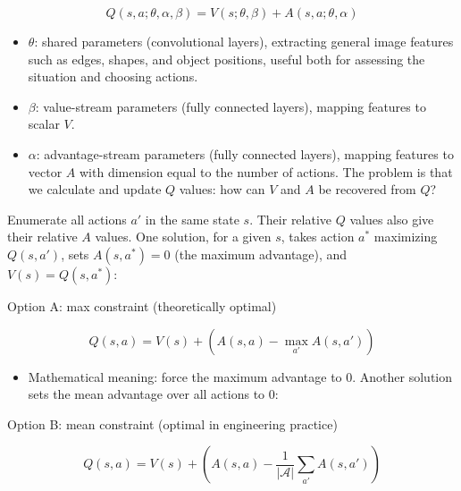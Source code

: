 \[
Q(s,a;\theta,\alpha,\beta)=V(s;\theta,\beta)+A(s,a;\theta,\alpha)
\]

\begin{itemize}
\tightlist
\item
  \(\theta\): shared parameters (convolutional layers), extracting general image features such as edges, shapes, and object positions, useful both for assessing the situation and choosing actions.
\item
  \(\beta\): value-stream parameters (fully connected layers), mapping features to scalar \(V\).
\item
  \(\alpha\): advantage-stream parameters (fully connected layers), mapping features to vector \(A\) with dimension equal to the number of actions.
  The problem is that we calculate and update \(Q\) values: how can \(V\) and \(A\) be recovered from \(Q\)?
\end{itemize}

Enumerate all actions \(a'\) in the same state \(s\). Their relative \(Q\) values also give their relative \(A\) values. One solution, for a given \(s\), takes action \(a^*\) maximizing \(Q(s,a')\), sets \(A(s,a^*)=0\) (the maximum advantage), and \(V(s)=Q(s,a^*)\):

Option A: max constraint (theoretically optimal)

\[
Q(s,a)=V(s)+(A(s,a)-\max_{a'}A(s,a'))
\]

\begin{itemize}
\tightlist
\item
  Mathematical meaning: force the maximum advantage to \(0\).
  Another solution sets the mean advantage over all actions to 0:
\end{itemize}

Option B: mean constraint (optimal in engineering practice)

\[
Q(s,a)=V(s)+(A(s,a)-\frac{1}{|\mathcal{A}|}\sum_{a'}A(s,a'))
\]

